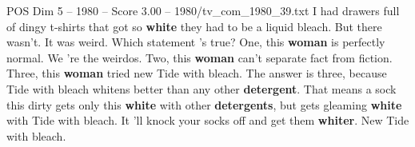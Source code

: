 \begin{textsample}{POS Dim 5 – 1980 – Score 3.00 – 1980/tv\_com\_1980\_39.txt}  \label{ex:f5_pos_004}
I had drawers full of dingy t-shirts that got so \textbf{white} they had to be a liquid bleach.
But there wasn't.
It was weird.
Which statement 's true?
One, this \textbf{woman} is perfectly normal.
We 're the weirdos.
Two, this \textbf{woman} can't separate fact from fiction.
Three, this \textbf{woman} tried new Tide with bleach.
The answer is three, because Tide with bleach whitens better than any other \textbf{detergent}.
That means a sock this dirty gets only this \textbf{white} with other \textbf{detergents}, but gets gleaming \textbf{white} with Tide with bleach.
It 'll knock your socks off and get them \textbf{whiter}.
New Tide with bleach.

\end{textsample}
